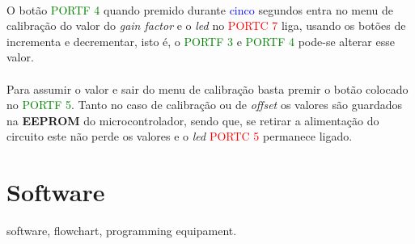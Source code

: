 \\
O botão \textcolor{green}{PORTF 4} quando premido durante \textcolor{blue}{cinco} segundos entra no menu de calibração do valor do \textit{gain factor} e o \textit{led} no \textcolor{red}{PORTC 7} liga, usando os botões de incrementa e decrementar, isto é, o
\textcolor{green}{PORTF 3} e \textcolor{green}{PORTF 4} pode-se alterar esse valor.\\
\\
Para assumir o valor e sair do menu de calibração basta premir o botão colocado no \textcolor{green}{PORTF 5}. Tanto no caso de calibração ou de \textit{offset} os valores são guardados na \textbf{EEPROM} do microcontrolador, sendo que, se retirar a alimentação do circuito este não perde os valores e o \textit{led} \textcolor{red}{PORTC 5} permanece ligado.
\newpage
\section{Software}
software, flowchart, programming equipament.


\newpage
